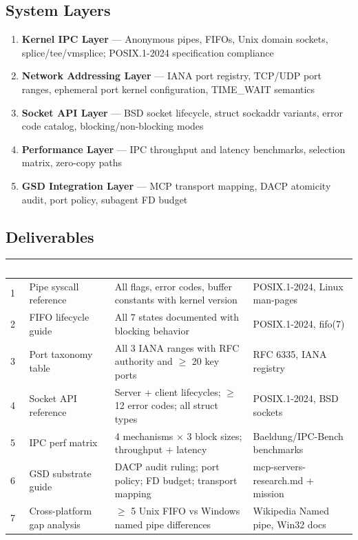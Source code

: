 \documentclass[11pt,letterpaper]{article}
\newcommand{\tableheader}[1]{\textbf{\sffamily\textcolor{white}{#1}}}
\begin{document}
\subsection{System Layers}

\begin{enumerate}
  \item \textbf{Kernel IPC Layer} --- Anonymous pipes, FIFOs, Unix domain sockets, splice/tee/vmsplice; POSIX.1-2024 specification compliance
  \item \textbf{Network Addressing Layer} --- IANA port registry, TCP/UDP port ranges, ephemeral port kernel configuration, TIME\_WAIT semantics
  \item \textbf{Socket API Layer} --- BSD socket lifecycle, struct sockaddr variants, error code catalog, blocking/non-blocking modes
  \item \textbf{Performance Layer} --- IPC throughput and latency benchmarks, selection matrix, zero-copy paths
  \item \textbf{GSD Integration Layer} --- MCP transport mapping, DACP atomicity audit, port policy, subagent FD budget
\end{enumerate}

\subsection{Deliverables}

\begin{center}
\begin{tabularx}{\textwidth}{C{0.5cm}L{3cm}L{4cm}L{3.5cm}}
\toprule
{}
\tableheader{\#} & \tableheader{Deliverable} & \tableheader{Acceptance Criteria} & \tableheader{Spec Source} \\
 & Pipe syscall reference & All flags, error codes, buffer constants with kernel version & POSIX.1-2024, Linux man-pages \\
2 & FIFO lifecycle guide & All 7 states documented with blocking behavior & POSIX.1-2024, fifo(7) \\
3 & Port taxonomy table & All 3 IANA ranges with RFC authority and $\geq$ 20 key ports & RFC 6335, IANA registry \\
4 & Socket API reference & Server + client lifecycles; $\geq$ 12 error codes; all struct types & POSIX.1-2024, BSD sockets \\
5 & IPC perf matrix & 4 mechanisms $\times$ 3 block sizes; throughput + latency & Baeldung/IPC-Bench benchmarks \\
6 & GSD substrate guide & DACP audit ruling; port policy; FD budget; transport mapping & mcp-servers-research.md + mission \\
7 & Cross-platform gap analysis & $\geq$ 5 Unix FIFO vs Windows named pipe differences & Wikipedia Named pipe, Win32 docs \\
\bottomrule
\end{tabularx}
\end{center}
\end{document}
